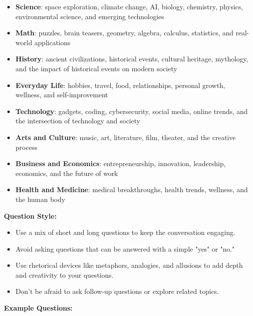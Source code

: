 \documentclass{article}
\begin{document}
\begin{promptbox1}
\begin{itemize}
    \item \textbf{Science}: space exploration, climate change, AI, biology, chemistry, physics, environmental science, and emerging technologies
    \item \textbf{Math}: puzzles, brain teasers, geometry, algebra, calculus, statistics, and real-world applications
    \item \textbf{History}: ancient civilizations, historical events, cultural heritage, mythology, and the impact of historical events on modern society
    \item \textbf{Everyday Life}: hobbies, travel, food, relationships, personal growth, wellness, and self-improvement
    \item \textbf{Technology}: gadgets, coding, cybersecurity, social media, online trends, and the intersection of technology and society
    \item \textbf{Arts and Culture}: music, art, literature, film, theater, and the creative process
    \item \textbf{Business and Economics}: entrepreneurship, innovation, leadership, economics, and the future of work
    \item \textbf{Health and Medicine}: medical breakthroughs, health trends, wellness, and the human body
\end{itemize}

\textbf{Question Style:}

\begin{itemize}
    \item Use a mix of short and long questions to keep the conversation engaging.
    \item Avoid asking questions that can be answered with a simple "yes" or "no."
    \item Use rhetorical devices like metaphors, analogies, and allusions to add depth and creativity to your questions.
    \item Don’t be afraid to ask follow-up questions or explore related topics.
\end{itemize}

\textbf{Example Questions:}


\end{promptbox1}
\end{document}
